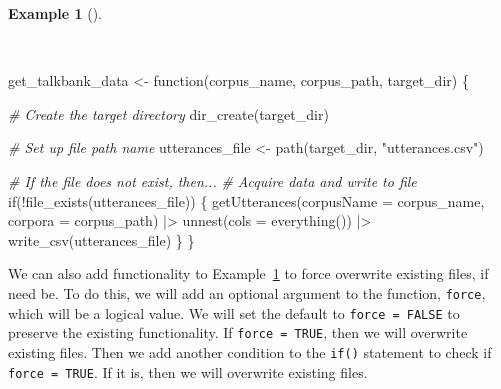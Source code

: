 \documentclass[
  letterpaper,
  DIV=11,
  numbers=noendperiod]{scrreport}
\newenvironment{Shaded}{\begin{snugshade}}{\end{snugshade}}
\newcommand{\AttributeTok}[1]{\textcolor[rgb]{0.00,0.00,0.00}{#1}}
\newcommand{\CommentTok}[1]{\textcolor[rgb]{0.00,0.00,0.00}{\textit{#1}}}
\newcommand{\ControlFlowTok}[1]{\textcolor[rgb]{0.00,0.00,0.00}{#1}}
\newcommand{\FunctionTok}[1]{\textcolor[rgb]{0.00,0.00,0.00}{#1}}
\newcommand{\NormalTok}[1]{\textcolor[rgb]{0.00,0.00,0.00}{#1}}
\newcommand{\OtherTok}[1]{\textcolor[rgb]{0.00,0.00,0.00}{#1}}
\newcommand{\SpecialCharTok}[1]{\textcolor[rgb]{0.00,0.00,0.00}{#1}}
\newcommand{\StringTok}[1]{\textcolor[rgb]{0.00,0.00,0.00}{#1}}
\theoremstyle{definition}
\newtheorem{example}{Example}[chapter]
\theoremstyle{remark}
\begin{document}
\begin{example}[]\protect\hypertarget{exm-ad-get-talkbank-data-3}{}\label{exm-ad-get-talkbank-data-3}

~

\begin{Shaded}
\begin{Highlighting}[]
\NormalTok{get\_talkbank\_data }\OtherTok{\textless{}{-}} \ControlFlowTok{function}\NormalTok{(corpus\_name, corpus\_path, target\_dir) \{}
  
  \CommentTok{\# Create the target directory}
  \FunctionTok{dir\_create}\NormalTok{(target\_dir)}

  \CommentTok{\# Set up file path name}
\NormalTok{  utterances\_file  }\OtherTok{\textless{}{-}} \FunctionTok{path}\NormalTok{(target\_dir, }\StringTok{"utterances.csv"}\NormalTok{)}
  
  \CommentTok{\# If the file does not exist, then...}
  \CommentTok{\# Acquire data and write to file}
  \ControlFlowTok{if}\NormalTok{(}\SpecialCharTok{!}\FunctionTok{file\_exists}\NormalTok{(utterances\_file)) \{}
    \FunctionTok{getUtterances}\NormalTok{(}\AttributeTok{corpusName =}\NormalTok{ corpus\_name, }\AttributeTok{corpora =}\NormalTok{ corpus\_path) }\SpecialCharTok{|\textgreater{}} 
      \FunctionTok{unnest}\NormalTok{(}\AttributeTok{cols =} \FunctionTok{everything}\NormalTok{()) }\SpecialCharTok{|\textgreater{}} 
      \FunctionTok{write\_csv}\NormalTok{(utterances\_file)}
\NormalTok{  \}}
\NormalTok{\}}
\end{Highlighting}
\end{Shaded}

\end{example}

We can also add functionality to
Example~\ref{exm-ad-get-talkbank-data-3} to force overwrite existing
files, if need be. To do this, we will add an optional argument to the
function, \texttt{force}, which will be a logical value. We will set the
default to \texttt{force\ =\ FALSE} to preserve the existing
functionality. If \texttt{force\ =\ TRUE}, then we will overwrite
existing files. Then we add another condition to the \texttt{if()}
statement to check if \texttt{force\ =\ TRUE}. If it is, then we will
overwrite existing files.
\end{document}
